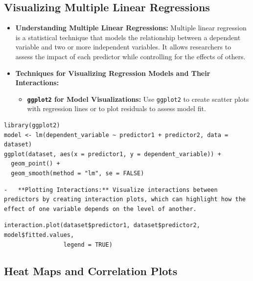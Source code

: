 \documentclass[
]{book}
\providecommand{\tightlist}{%
  \setlength{\itemsep}{0pt}\setlength{\parskip}{0pt}}
\begin{document}
\hypertarget{visualizing-multiple-linear-regressions}{%
\subsection{Visualizing Multiple Linear Regressions}\label{visualizing-multiple-linear-regressions}}

\begin{itemize}
\item
  \textbf{Understanding Multiple Linear Regressions:} Multiple linear regression is a statistical technique that models the relationship between a dependent variable and two or more independent variables. It allows researchers to assess the impact of each predictor while controlling for the effects of others.
\item
  \textbf{Techniques for Visualizing Regression Models and Their Interactions:}

  \begin{itemize}
  \tightlist
  \item
    \textbf{\texttt{ggplot2} for Model Visualizations:} Use \texttt{ggplot2} to create scatter plots with regression lines or to plot residuals to assess model fit.
  \end{itemize}
\end{itemize}

\begin{verbatim}
library(ggplot2)
model <- lm(dependent_variable ~ predictor1 + predictor2, data = dataset)
ggplot(dataset, aes(x = predictor1, y = dependent_variable)) + 
  geom_point() + 
  geom_smooth(method = "lm", se = FALSE)
\end{verbatim}

\begin{verbatim}
-   **Plotting Interactions:** Visualize interactions between predictors by creating interaction plots, which can highlight how the effect of one variable depends on the level of another.
\end{verbatim}

\begin{verbatim}
interaction.plot(dataset$predictor1, dataset$predictor2, model$fitted.values,
                 legend = TRUE)
\end{verbatim}

\hypertarget{heat-maps-and-correlation-plots}{%
\subsection{Heat Maps and Correlation Plots}\label{heat-maps-and-correlation-plots}}
\end{document}
